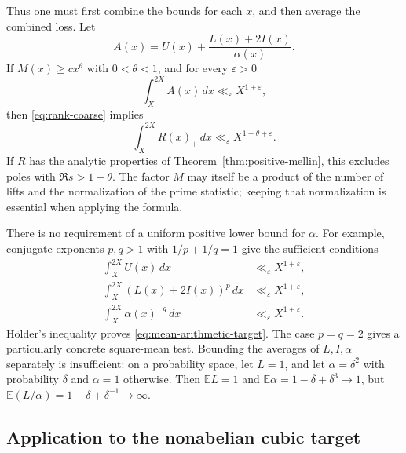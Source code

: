 Thus one must first combine the bounds for each $x$, and then average the
combined loss. Let
\[
 A(x)=U(x)+\frac{L(x)+2I(x)}{\alpha(x)}.
\]
If $M(x)\ge c x^\theta$ with $0<\theta<1$, and for every
$\varepsilon>0$
\begin{equation}\label{eq:mean-arithmetic-target}
 \int_X^{2X} A(x)\,dx\ll_\varepsilon X^{1+\varepsilon},
\end{equation}
then \eqref{eq:rank-coarse} implies
\[
 \int_X^{2X}R(x)_+\,dx
 \ll_\varepsilon X^{1-\theta+\varepsilon}.
\]
If $R$ has the analytic properties of Theorem~\ref{thm:positive-mellin},
this excludes poles with $\Re s>1-\theta$. The factor $M$ may itself
be a product of the number of lifts and the normalization of the prime
statistic; keeping that normalization is essential when applying the formula.

There is no requirement of a uniform positive lower bound for $\alpha$.
For example, conjugate exponents $p,q>1$ with $1/p+1/q=1$ give the
sufficient conditions
\begin{align*}
 \int_X^{2X}U(x)\,dx&\ll_\varepsilon X^{1+\varepsilon},\\
 \int_X^{2X}(L(x)+2I(x))^p\,dx&\ll_\varepsilon X^{1+\varepsilon},\\
 \int_X^{2X}\alpha(x)^{-q}\,dx&\ll_\varepsilon X^{1+\varepsilon}.
\end{align*}
H\"older's inequality proves \eqref{eq:mean-arithmetic-target}. The
case $p=q=2$ gives a particularly concrete square-mean test. Bounding
the averages of $L,I,\alpha$ separately is insufficient: on a probability
space, let $L=1$, and let $\alpha=\delta^2$ with probability $\delta$
and $\alpha=1$ otherwise. Then $\mathbb E L=1$ and
$\mathbb E\alpha=1-\delta+\delta^3\to1$, but
$\mathbb E(L/\alpha)=1-\delta+\delta^{-1}\to\infty$.

\subsection{Application to the nonabelian cubic target}

